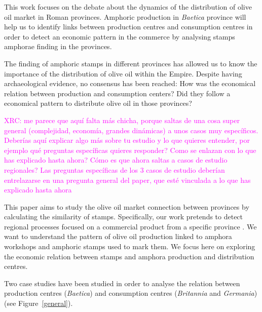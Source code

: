 \documentclass[review]{elsarticle}
\newcommand{\memo}[2]{\textcolor{#1}{#2}}
\newcommand{\xavi}[1]{\memo{magenta}{XRC: #1\\}}
\begin{document}
This work focuses on the debate about the dynamics of the distribution of olive oil market in Roman provinces. Amphoric production in \textit{Baetica} province will help us to identify links between production centres and consumption centres in order to detect an economic pattern in the commerce by analysing stamps amphorae finding in the provinces. 

The finding of amphoric stamps in different provinces has allowed us to know the importance of the distribution of olive oil within the Empire. Despite having archaeological evidence, no consensus has been reached: How was the economical relation between production and consumption centers? Did they follow a economical pattern to distribute olive oil in those provinces?
  

\xavi{me parece que aquí falta más chicha, porque saltas de una cosa super general (complejidad, economía, grandes dinámicas) a unos casos muy específicos. Deberías aquí explicar algo más sobre tu estudio y lo que quieres entender, por ejemplo qué preguntas específicas quieres responder? Como se enlazan con lo que has explicado hasta ahora? Cómo es que ahora saltas a casos de estudio regionales? Las preguntas específicas de los 3 casos de estudio deberían entrelazarse en una pregunta general del paper, que esté vinculada a lo que has explicado hasta ahora}

This paper aims to study the olive oil market connection between provinces by calculating the similarity of stamps. Specifically, our work pretends to detect regional processes focused on a commercial product from a specific province \citep{isaksen_network_2006}. We want to understand the pattern of olive oil production linked to amphora workshops and amphoric stamps used to mark them. We focus here on exploring the economic relation between stamps and amphora production and distribution centres. 

Two case studies have been studied in order to analyse the relation between production centres (\textit{Baetica}) and consumption centres (\textit{Britannia} and \textit{Germania}) (see Figure~\ref{general}).
\end{document}

